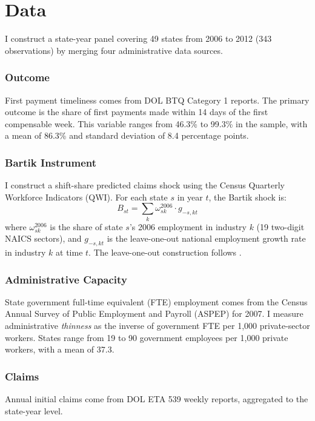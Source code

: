 \documentclass[12pt]{article}
\begin{document}
\section{Data}

I construct a state-year panel covering 49 states from 2006 to 2012 (343 observations) by merging four administrative data sources.

\subsubsection*{Outcome} First payment timeliness comes from DOL BTQ Category 1 reports. The primary outcome is the share of first payments made within 14 days of the first compensable week. This variable ranges from 46.3\% to 99.3\% in the sample, with a mean of 86.3\% and standard deviation of 8.4 percentage points.

\subsubsection*{Bartik Instrument} I construct a shift-share predicted claims shock using the Census Quarterly Workforce Indicators (QWI). For each state $s$ in year $t$, the Bartik shock is:
\begin{equation}
B_{st} = \sum_{k} \omega_{sk}^{2006} \cdot g_{-s,kt}
\label{eq:bartik}
\end{equation}
where $\omega_{sk}^{2006}$ is the share of state $s$'s 2006 employment in industry $k$ (19 two-digit NAICS sectors), and $g_{-s,kt}$ is the leave-one-out national employment growth rate in industry $k$ at time $t$. The leave-one-out construction follows \citet{borusyak2022}.

\subsubsection*{Administrative Capacity} State government full-time equivalent (FTE) employment comes from the Census Annual Survey of Public Employment and Payroll (ASPEP) for 2007. I measure administrative \emph{thinness} as the inverse of government FTE per 1,000 private-sector workers. States range from 19 to 90 government employees per 1,000 private workers, with a mean of 37.3.

\subsubsection*{Claims} Annual initial claims come from DOL ETA 539 weekly reports, aggregated to the state-year level.
\end{document}

